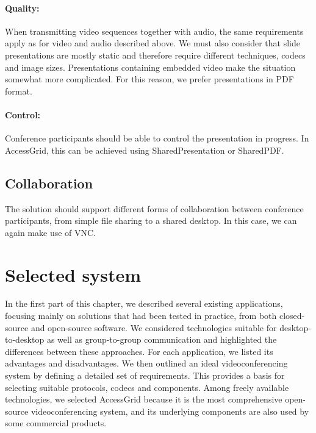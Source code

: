 \paragraph*{Quality:}
When transmitting video sequences together with audio, the same requirements apply as for video and audio described above. We must also consider that slide presentations are mostly static and therefore require different techniques, codecs and image sizes. Presentations containing embedded video make the situation somewhat more complicated. For this reason, we prefer presentations in PDF format.

\paragraph*{Control:}
Conference participants should be able to control the presentation in progress. In AccessGrid, this can be achieved using SharedPresentation or SharedPDF.

\subsection{Collaboration}


The solution should support different forms of collaboration between conference participants, from simple file sharing to a shared desktop. In this case, we can again make use of VNC.

\section{Selected system}

In the first part of this chapter, we described several existing applications, focusing mainly on solutions that had been tested in practice, from both closed-source and open-source software. We considered technologies suitable for desktop-to-desktop as well as group-to-group communication and highlighted the differences between these approaches. For each application, we listed its advantages and disadvantages. We then outlined an ideal videoconferencing system by defining a detailed set of requirements. This provides a basis for selecting suitable protocols, codecs and components. Among freely available technologies, we selected AccessGrid because it is the most comprehensive open-source videoconferencing system, and its underlying components are also used by some commercial products.
